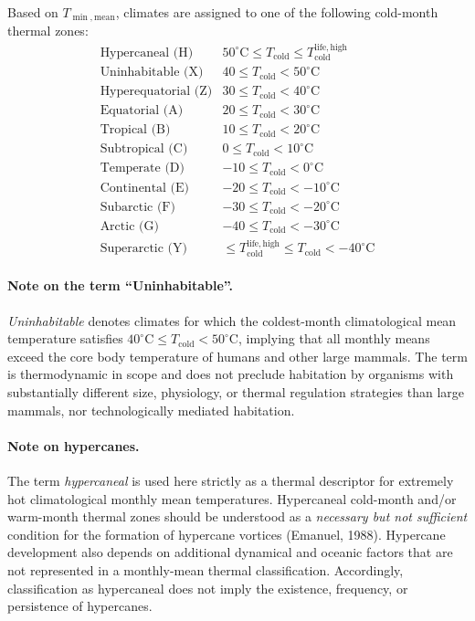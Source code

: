\documentclass[12pt]{article}
\newcommand{\cold}{\mathrm{cold}}
\begin{document}
Based on $T_{\min,\mathrm{mean}}$, climates are assigned to one of the
following cold-month thermal zones:
\[
\begin{array}{ll}
\text{Hypercaneal (H)}        &
50^\circ\mathrm{C} \le T_{\cold}
\le T_{\cold}^{\mathrm{life,high}} \\
\text{Uninhabitable (X)}      & 40 \le T_{\cold} < 50^\circ\mathrm{C} \\
\text{Hyperequatorial (Z)}    & 30 \le T_{\cold} < 40^\circ\mathrm{C} \\
\text{Equatorial (A)}         & 20 \le T_{\cold} < 30^\circ\mathrm{C} \\
\text{Tropical (B)}           & 10 \le T_{\cold} < 20^\circ\mathrm{C} \\
\text{Subtropical (C)}        & 0 \le T_{\cold} < 10^\circ\mathrm{C} \\
\text{Temperate (D)}          & -10 \le T_{\cold} < 0^\circ\mathrm{C} \\
\text{Continental (E)}        & -20 \le T_{\cold} < -10^\circ\mathrm{C} \\
\text{Subarctic (F)}          & -30 \le T_{\cold} < -20^\circ\mathrm{C} \\
\text{Arctic (G)}             & -40 \le T_{\cold} < -30^\circ\mathrm{C} \\
\text{Superarctic (Y)}        &
\le T_{\cold}^{\mathrm{life,high}}
\le T_{\cold} < -40^\circ\mathrm{C}
\end{array}
\]

\paragraph{Note on the term ``Uninhabitable''.}
\emph{Uninhabitable} denotes climates for which the coldest-month
climatological mean temperature satisfies
$40^\circ\mathrm{C} \le T_{\cold} < 50^\circ\mathrm{C}$, implying
that all monthly means exceed the core body temperature of humans and other
large mammals. The term is thermodynamic in scope and does not preclude
habitation by organisms with substantially different size, physiology, or
thermal regulation strategies than large mammals, nor technologically
mediated habitation.

\paragraph{Note on hypercanes.}
The term \emph{hypercaneal} is used here strictly as a thermal descriptor for extremely hot climatological monthly mean temperatures. Hypercaneal cold-month and/or warm-month thermal zones should be understood as a \emph{necessary but not sufficient} condition for the formation of hypercane vortices (Emanuel, 1988). Hypercane development also depends on additional dynamical and oceanic factors that are not represented in a monthly-mean thermal
classification. Accordingly, classification as hypercaneal does not imply the existence, frequency, or persistence of hypercanes.
\end{document}
